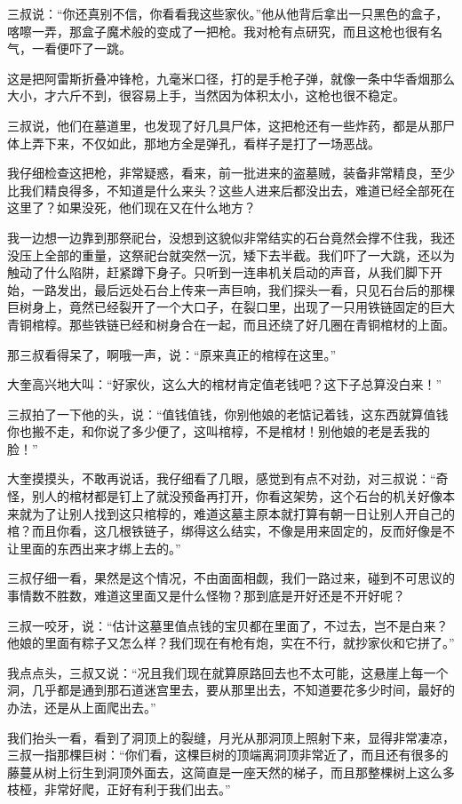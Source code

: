 三叔说：“你还真别不信，你看看我这些家伙。”他从他背后拿出一只黑色的盒子，喀嚓一弄，那盒子魔术般的变成了一把枪。我对枪有点研究，而且这枪也很有名气，一看便吓了一跳。

这是把阿雷斯折叠冲锋枪，九毫米口径，打的是手枪子弹，就像一条中华香烟那么大小，才六斤不到，很容易上手，当然因为体积太小，这枪也很不稳定。

三叔说，他们在墓道里，也发现了好几具尸体，这把枪还有一些炸药，都是从那尸体上弄下来，不仅如此，那地方全是弹孔，看样子是打了一场恶战。

我仔细检查这把枪，非常疑惑，看来，前一批进来的盗墓贼，装备非常精良，至少比我们精良得多，不知道是什么来头？这些人进来后都没出去，难道已经全部死在这里了？如果没死，他们现在又在什么地方？

我一边想一边靠到那祭祀台，没想到这貌似非常结实的石台竟然会撑不住我，我还没压上全部的重量，这祭祀台就突然一沉，矮下去半截。我们吓了一大跳，还以为触动了什么陷阱，赶紧蹲下身子。只听到一连串机关启动的声音，从我们脚下开始，一路发出，最后远处石台上传来一声巨响，我们探头一看，只见石台后的那棵巨树身上，竟然已经裂开了一个大口子，在裂口里，出现了一只用铁链固定的巨大青铜棺椁。那些铁链已经和树身合在一起，而且还绕了好几圈在青铜棺材的上面。

那三叔看得呆了，啊哦一声，说：“原来真正的棺椁在这里。”

大奎高兴地大叫：“好家伙，这么大的棺材肯定值老钱吧？这下子总算没白来！”

三叔拍了一下他的头，说：“值钱值钱，你别他娘的老惦记着钱，这东西就算值钱你也搬不走，和你说了多少便了，这叫棺椁，不是棺材！别他娘的老是丢我的脸！”

大奎摸摸头，不敢再说话，我仔细看了几眼，感觉到有点不对劲，对三叔说：“奇怪，别人的棺材都是钉上了就没预备再打开，你看这架势，这个石台的机关好像本来就为了让别人找到这只棺椁的，难道这墓主原本就打算有朝一日让别人开自己的棺？而且你看，这几根铁链子，绑得这么结实，不像是用来固定的，反而好像是不让里面的东西出来才绑上去的。”

三叔仔细一看，果然是这个情况，不由面面相觑，我们一路过来，碰到不可思议的事情数不胜数，难道这里面又是什么怪物？那到底是开好还是不开好呢？

三叔一咬牙，说：“估计这墓里值点钱的宝贝都在里面了，不过去，岂不是白来？他娘的里面有粽子又怎么样？我们现在有枪有炮，实在不行，就抄家伙和它拼了。”

我点点头，三叔又说：“况且我们现在就算原路回去也不太可能，这悬崖上每一个洞，几乎都是通到那石道迷宫里去，要从那里出去，不知道要花多少时间，最好的办法，还是从上面爬出去。”

我们抬头一看，看到了洞顶上的裂缝，月光从那洞顶上照射下来，显得非常凄凉，三叔一指那棵巨树：“你们看，这棵巨树的顶端离洞顶非常近了，而且还有很多的藤蔓从树上衍生到洞顶外面去，这简直是一座天然的梯子，而且那整棵树上这么多枝桠，非常好爬，正好有利于我们出去。”

